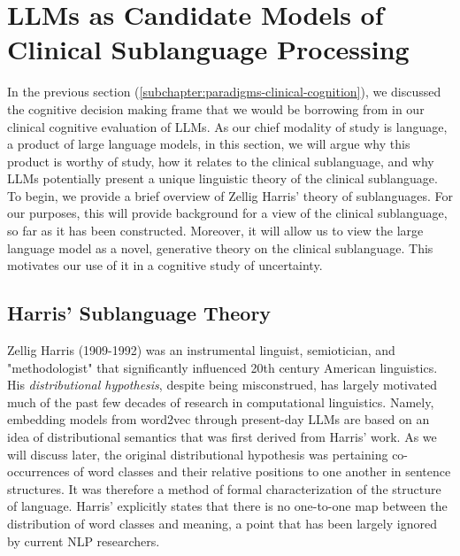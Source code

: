 \section{LLMs as Candidate Models of Clinical Sublanguage Processing}
In the previous section (\ref{subchapter:paradigms-clinical-cognition}), we discussed the cognitive decision making frame that we would be borrowing from in our clinical cognitive evaluation of LLMs. As our chief modality of study is language, a product of large language models, in this section, we will argue why this product is worthy of study, how it relates to the clinical sublanguage, and why LLMs potentially present a unique linguistic theory of the clinical sublanguage. To begin, we provide a brief overview of Zellig Harris' theory of sublanguages. For our purposes, this will provide background for a view of the clinical sublanguage, so far as it has been constructed. Moreover, it will allow us to view the large language model as a novel, generative theory on the clinical sublanguage. This motivates our use of it in a cognitive study of uncertainty. 

\subsection{Harris' Sublanguage Theory}
Zellig Harris (1909-1992) was an instrumental linguist, semiotician, and "methodologist" \cite{nevinZelligHarrisAppreciation} that significantly influenced 20th century American linguistics. His \emph{distributional hypothesis}, despite being misconstrued, has largely motivated much of the past few decades of research in computational linguistics. Namely, embedding models from word2vec through present-day LLMs are based on an idea of distributional semantics that was first derived from Harris' work. As we will discuss later, the original distributional hypothesis was pertaining co-occurrences of word classes and their relative positions to one another in sentence structures. It was therefore a method of formal characterization of the structure of language. Harris' explicitly states that there is no one-to-one map between the distribution of word classes and meaning, a point that has been largely ignored by current NLP researchers. 


